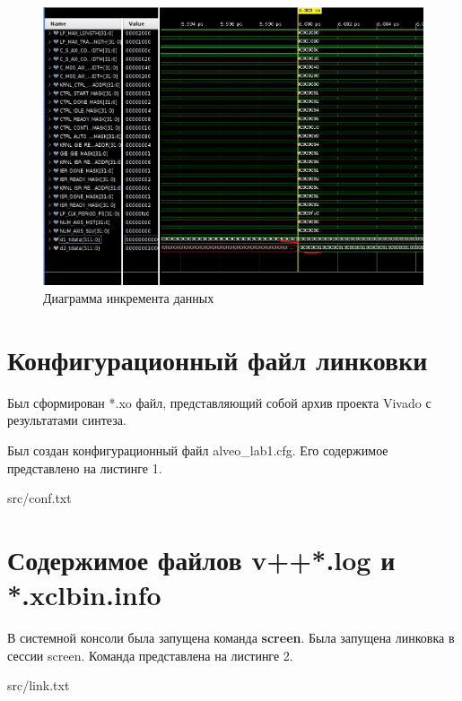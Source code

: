 \FloatBarrier
\begin{figure}[h]
	\begin{center}
		\includegraphics[width=\linewidth]{inc/inc_original.png}
	\end{center}
	\caption{Диаграмма инкремента данных}
\end{figure}
\FloatBarrier

\section*{Конфигурационный файл линковки}
Был сформирован *.xo файл, представляющий собой архив проекта Vivado с результатами синтеза.

Был создан конфигурационный файл alveo\_lab1.cfg.
Его содержимое представлено на листинге 1.
\begin{lstinputlisting}[caption=Конфигурационный файл линковки, 
basicstyle=\footnotesize\ttfamily, frame=single,breaklines=true]{src/conf.txt}
\end{lstinputlisting}

\section*{Содержимое файлов v++*.log и *.xclbin.info}
В системной консоли была запущена команда \textbf{screen}.
Была запущена линковка в сессии screen. Команда представлена на листинге 2.
\begin{lstinputlisting}[caption=Команда запуска линковки, 
	basicstyle=\footnotesize\ttfamily, frame=single,breaklines=true]{src/link.txt}
\end{lstinputlisting}

